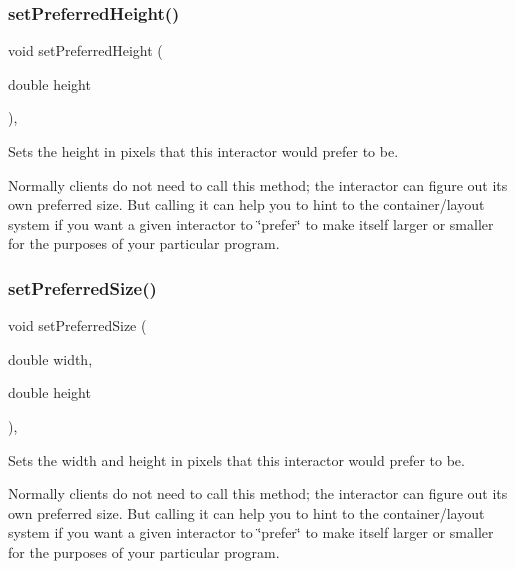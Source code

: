 \subsubsection{\texorpdfstring{set\+Preferred\+Height()}{setPreferredHeight()}}
{\footnotesize\ttfamily void set\+Preferred\+Height (\begin{DoxyParamCaption}\item[{double}]{height }\end{DoxyParamCaption})\hspace{0.3cm}{\ttfamily [virtual]}, {\ttfamily [inherited]}}



Sets the height in pixels that this interactor would prefer to be. 

Normally clients do not need to call this method; the interactor can figure out its own preferred size. But calling it can help you to hint to the container/layout system if you want a given interactor to \char`\"{}prefer\char`\"{} to make itself larger or smaller for the purposes of your particular program. \mbox{\label{classGInteractor_a042c5ae19430d765ef552371cae3632c}} 
\subsubsection{\texorpdfstring{set\+Preferred\+Size()}{setPreferredSize()}\hspace{0.1cm}{\footnotesize\ttfamily [1/2]}}
{\footnotesize\ttfamily void set\+Preferred\+Size (\begin{DoxyParamCaption}\item[{double}]{width,  }\item[{double}]{height }\end{DoxyParamCaption})\hspace{0.3cm}{\ttfamily [virtual]}, {\ttfamily [inherited]}}



Sets the width and height in pixels that this interactor would prefer to be. 

Normally clients do not need to call this method; the interactor can figure out its own preferred size. But calling it can help you to hint to the container/layout system if you want a given interactor to \char`\"{}prefer\char`\"{} to make itself larger or smaller for the purposes of your particular program. \mbox{\label{classGInteractor_aa22d9be4bc0e078bb0ea69b0fc9d7c75}} 
